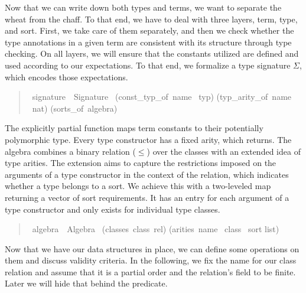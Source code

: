 Now that we can write down both types and terms, we want to separate the wheat from the chaff.
To that end, we have to deal with three layers, term, type, and sort.
First, we take care of them separately, and then we check whether the type annotations in a given term are consistent with its structure through type checking.
On all layers, we will ensure that the constants utilized are defined and used according to our expectations.
To that end, we formalize a type signature \(\Sigma\), which encodes those expectations.

\begin{quote}
    \begin{isabelle}
        \ signature\ {\isacharequal}\ Signature\ \isanewline
        \isaindent{\ \ }(const\_typ\_of{\isacharcolon}\ name \isasymrightharpoonup\ typ)\isanewline
        \isaindent{\ \ }(typ\_arity\_of{\isacharcolon}\ name \isasymrightharpoonup\ nat)\isanewline
        \isaindent{\ \ }(sorts\_of{\isacharcolon}\ algebra)
    \end{isabelle}
\end{quote}

The explicitly partial  function  maps term constants to their potentially polymorphic type.
Every type constructor has a fixed arity, which  returns.
The algebra combines a binary relation (\(\leq\)) over the classes with an extended idea of type arities.
The extension aims to capture the restrictions imposed on the arguments of a type constructor in the context of the  relation, which indicates whether a type belongs to a sort.
We achieve this with a two-leveled map returning a vector of sort requirements.
It has an entry for each argument of a type constructor and only exists for individual type classes.

\begin{quote}
    \begin{isabelle}
        \ algebra\ {\isacharequal}\ Algebra\ \isanewline
        \isaindent{\ \ }(classes{\isacharcolon}\ class\ rel)\isanewline
        \isaindent{\ \ }(arities{\isacharcolon}\ name \isasymrightharpoonup\ class \isasymrightharpoonup\ sort list)
    \end{isabelle}
\end{quote}

Now that we have our data structures in place, we can define some operations on them and discuss validity criteria.
In the following, we fix the name  for our class relation and assume that it is a partial order and the relation's field to be finite.
Later we will hide that behind the  predicate.

